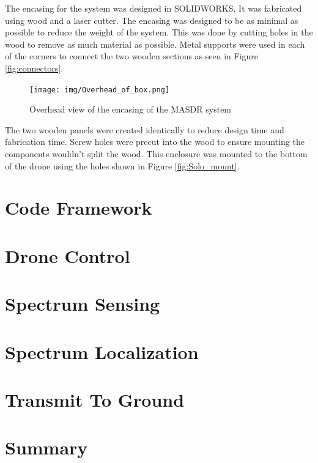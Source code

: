 The encasing for the system was designed in SOLIDWORKS. It was fabricated using wood and a laser cutter. The encasing was designed to be as minimal as possible to reduce the weight of the system. This was done by cutting holes in the wood to remove as much material as possible. Metal supports were used in each of the corners to connect the two wooden sections as seen in Figure \ref{fig:connectors}.
\begin{figure}[ht!]
	\centering
	\texttt{[image: img/Overhead\_of\_box.png]}
	\caption{Overhead view of the encasing of the MASDR system}
	\label{fig:overhead_of_box}
\end{figure}\par
The two wooden panels were created identically to reduce design time and fabrication time. Screw holes were precut into the wood to ensure mounting the components wouldn't split the wood. This enclosure was mounted to the bottom of the drone using the holes shown in Figure \ref{fig:Solo_mount}. \par


\section{Code Framework}
\section{Drone Control}
\section{Spectrum Sensing}
\section{Spectrum Localization}
\section{Transmit To Ground}
\section{Summary}
